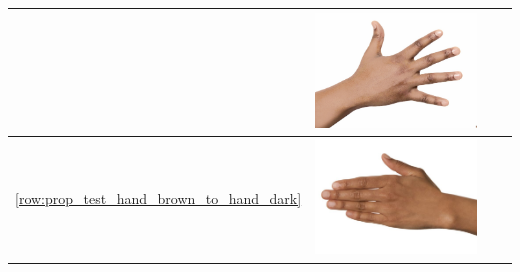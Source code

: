 \begin{longtable}{|c||c|c|c|}
\begin{minipage}{.29\textwidth}
  \end{minipage} & 
  \begin{minipage}{.29\textwidth}
    \includegraphics[width=\textwidth,height=\textheight,keepaspectratio]{../rc_test/outputs/20170516_proportional_test/hand_dark_to_hand_light.jpg}
  \end{minipage} \\
    \hline  \ref{row:prop_test_hand_brown_to_hand_dark} &
  \begin{minipage}{.29\textwidth}
    \includegraphics[width=\textwidth,height=\textheight,keepaspectratio]{../inputs/hand_brown.jpg}
  \end{minipage} & 
  \begin{minipage}{.29\textwidth}

\end{minipage}
\end{longtable}
